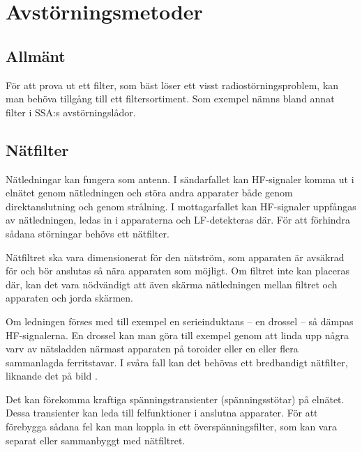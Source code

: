 \section{Avstörningsmetoder}
\label{avstörning}


\subsection{Allmänt}
För att prova ut ett filter, som bäst löser ett visst radiostörningsproblem,
kan man behöva tillgång till ett filtersortiment.
Som exempel nämns bland annat filter i SSA:s avstörningslådor.

\subsection{Nätfilter}

Nätledningar kan fungera som antenn.
I sändarfallet kan HF-signaler komma ut i elnätet genom nätledningen och störa
andra apparater både genom direktanslutning och genom strålning.
I mottagarfallet kan HF-signaler uppfångas av nätledningen, ledas in i
apparaterna och LF-detekteras där.
För att förhindra sådana störningar behövs ett nätfilter.

Nätfiltret ska vara dimensionerat för den nätström, som apparaten är avsäkrad
för och bör anslutas så nära apparaten som möjligt.
Om filtret inte kan placeras där, kan det vara nödvändigt att även skärma
nätledningen mellan filtret och apparaten och jorda skärmen.


Om ledningen förses med till exempel en serieinduktans -- en drossel -- så dämpas
HF-signalerna.
En drossel kan man göra till exempel genom att linda upp några varv av nätsladden
närmast apparaten på toroider eller en eller flera sammanlagda ferritstavar.
I svåra fall kan det behövas ett bredbandigt nätfilter, liknande
det på bild .

Det kan förekomma kraftiga spänningstransienter (spänningsstötar) på elnätet.
Dessa transienter kan leda till felfunktioner i anslutna apparater.
För att förebygga sådana fel kan man koppla in ett överspänningsfilter, som kan
vara separat eller sammanbyggt med nätfiltret.

